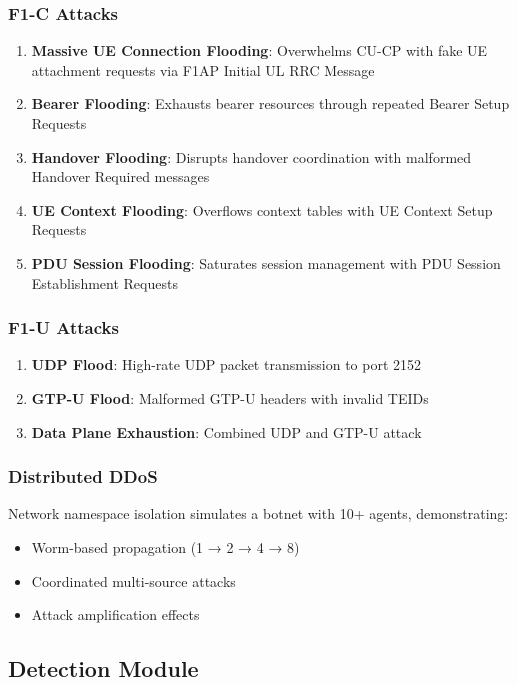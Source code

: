 \documentclass[conference]{IEEEtran}
\begin{document}
\subsubsection{F1-C Attacks}
\begin{enumerate}
    \item \textbf{Massive UE Connection Flooding}: Overwhelms CU-CP with fake UE attachment requests via F1AP Initial UL RRC Message
    \item \textbf{Bearer Flooding}: Exhausts bearer resources through repeated Bearer Setup Requests
    \item \textbf{Handover Flooding}: Disrupts handover coordination with malformed Handover Required messages
    \item \textbf{UE Context Flooding}: Overflows context tables with UE Context Setup Requests
    \item \textbf{PDU Session Flooding}: Saturates session management with PDU Session Establishment Requests
\end{enumerate}

\subsubsection{F1-U Attacks}
\begin{enumerate}
    \item \textbf{UDP Flood}: High-rate UDP packet transmission to port 2152
    \item \textbf{GTP-U Flood}: Malformed GTP-U headers with invalid TEIDs
    \item \textbf{Data Plane Exhaustion}: Combined UDP and GTP-U attack
\end{enumerate}

\subsubsection{Distributed DDoS}
Network namespace isolation simulates a botnet with 10+ agents, demonstrating:
\begin{itemize}
    \item Worm-based propagation (1 → 2 → 4 → 8)
    \item Coordinated multi-source attacks
    \item Attack amplification effects
\end{itemize}

\subsection{Detection Module}
\end{document}
